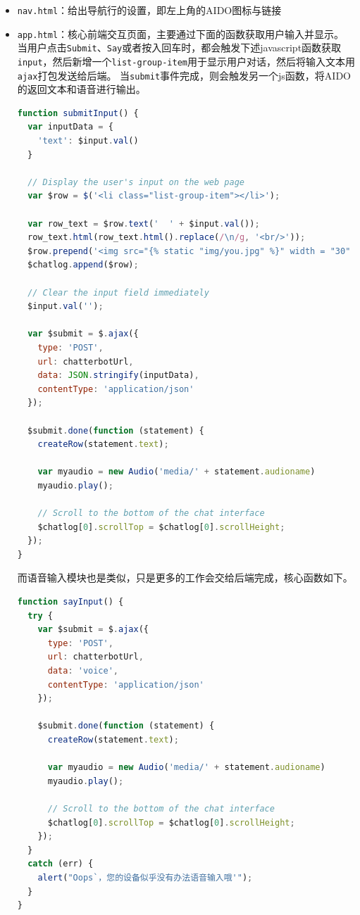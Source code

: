\documentclass[logo,reportComp]{thesis}
\begin{document}
\begin{itemize}
\item \verb'nav.html'：给出导航行的设置，即左上角的AIDO图标与链接

\item \verb'app.html'：核心前端交互页面，主要通过下面的函数获取用户输入并显示。
当用户点击\verb'Submit'、\verb'Say'或者按入回车时，都会触发下述javascript函数获取\verb'input'，然后新增一个\verb'list-group-item'用于显示用户对话，然后将输入文本用\verb'ajax'打包发送给后端。
当\verb'submit'事件完成，则会触发另一个js函数，将AIDO的返回文本和语音进行输出。
\begin{lstlisting}[language=javascript]
function submitInput() {
  var inputData = {
    'text': $input.val()
  }

  // Display the user's input on the web page
  var $row = $('<li class="list-group-item"></li>');

  var row_text = $row.text('  ' + $input.val());
  row_text.html(row_text.html().replace(/\n/g, '<br/>'));
  $row.prepend('<img src="{% static "img/you.jpg" %}" width = "30" height = "30" class= "d-inline-block align-top" alt = "you" >');
  $chatlog.append($row);

  // Clear the input field immediately
  $input.val('');

  var $submit = $.ajax({
    type: 'POST',
    url: chatterbotUrl,
    data: JSON.stringify(inputData),
    contentType: 'application/json'
  });

  $submit.done(function (statement) {
    createRow(statement.text);

    var myaudio = new Audio('media/' + statement.audioname)
    myaudio.play();

    // Scroll to the bottom of the chat interface
    $chatlog[0].scrollTop = $chatlog[0].scrollHeight;
  });
}
\end{lstlisting}
而语音输入模块也是类似，只是更多的工作会交给后端完成，核心函数如下。
\begin{lstlisting}[language=javascript]
function sayInput() {
  try {
    var $submit = $.ajax({
      type: 'POST',
      url: chatterbotUrl,
      data: 'voice',
      contentType: 'application/json'
    });

    $submit.done(function (statement) {
      createRow(statement.text);

      var myaudio = new Audio('media/' + statement.audioname)
      myaudio.play();

      // Scroll to the bottom of the chat interface
      $chatlog[0].scrollTop = $chatlog[0].scrollHeight;
    });
  }
  catch (err) {
    alert("Oops`，您的设备似乎没有办法语音输入哦'");
  }
}
\end{lstlisting}
\end{itemize}
\end{document}
